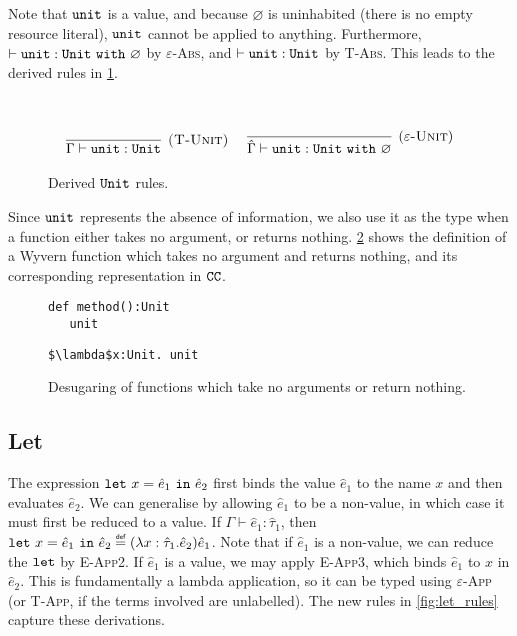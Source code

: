 Note that $\mathtt{unit}$ is a value, and because $\varnothing$ is uninhabited (there is no empty resource literal), $\mathtt{unit}$ cannot be applied to anything. Furthermore, $\vdash \mathtt{unit}: \mathtt{Unit}~\mathtt{with}~ \varnothing$ by \textsc{$\varepsilon$-Abs}, and $\vdash \mathtt{unit}: \mathtt{Unit}$ by \textsc{T-Abs}. This leads to the derived rules in \ref{fig:unit_rules}.

\begin{figure}[h]


 \\


\[
\begin{array}{c}

\infer[\textsc{(T-Unit)}]
	{\Gamma \vdash \unit : \Unit}
	{} ~~~~

\infer[(\textsc{$\varepsilon$-Unit})]
	{\hat \Gamma \vdash \unit : \Unit~\kw{with} \varnothing}
	{}

\end{array}
\]

\caption{Derived $\mathtt{Unit}$ rules.}
\label{fig:unit_rules}
\end{figure}

Since $\mathtt{unit}$ represents the absence of information, we also use it as the type when a function either takes no argument, or returns nothing. \ref{fig:unit_sugaring} shows the definition of a Wyvern function which takes no argument and returns nothing, and its corresponding representation in $\mathtt{CC}$.

\begin{figure}[h]

\begin{lstlisting}
def method():Unit
   unit
\end{lstlisting}

\begin{lstlisting}
$\lambda$x:Unit. unit
\end{lstlisting}

\caption{Desugaring of functions which take no arguments or return nothing.}
\label{fig:unit_sugaring}
\end{figure}

\subsection{Let}

\noindent
The expression $\mathtt{let}~ x = \hat e_1~\mathtt{in}~ \hat e_2$ first binds the value $\hat e_1$ to the name $x$ and then evaluates $\hat e_2$. We can generalise by allowing $\hat e_1$ to be a non-value, in which case it must first be reduced to a value. If $\Gamma \vdash \hat e_1: \hat \tau_1$, then $\letxpr{x}{\hat e_1}{\hat e_2} \defn (\lambda x: \hat \tau_1 . \hat e_2) \hat e_1$. Note that if $\hat e_1$ is a non-value, we can reduce the $\mathtt{let}$ by \textsc{E-App2}. If $\hat e_1$ is a value, we may apply \textsc{E-App3}, which binds $\hat e_1$ to $x$ in $\hat e_2$. This is fundamentally a lambda application, so it can be typed using \textsc{$\varepsilon$-App} (or \textsc{T-App}, if the terms involved are unlabelled). The new rules in \ref{fig:let_rules} capture these derivations.

